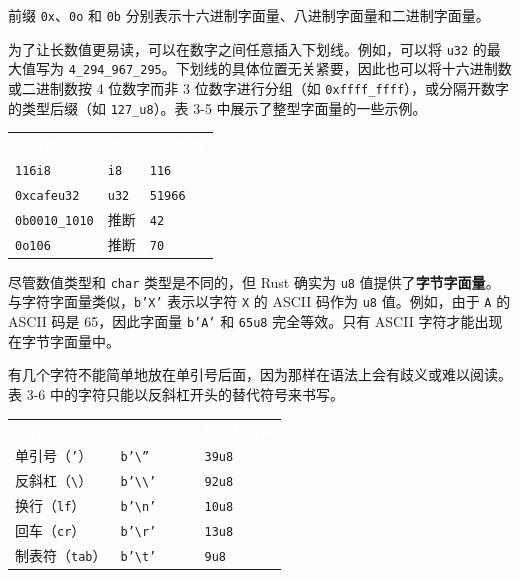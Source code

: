 前缀 \texttt{0x}、\texttt{0o} 和 \texttt{0b} 分别表示十六进制字面量、八进制字面量和二进制字面量。

为了让长数值更易读，可以在数字之间任意插入下划线。例如，可以将 \texttt{u32} 的最大值写为 \texttt{4\_294\_967\_295}。下划线的具体位置无关紧要，因此也可以将十六进制数或二进制数按 4 位数字而非 3 位数字进行分组（如 \texttt{0xffff\_ffff}），或分隔开数字的类型后缀（如 \texttt{127\_u8}）。表 3-5 中展示了整型字面量的一些示例。


\myTableBegin
\begin{tabularx}{\textwidth}{@{}>{\hsize=1.142\hsize\raggedright\arraybackslash}X>{\hsize=0.903\hsize\raggedright\arraybackslash}X>{\hsize=0.956\hsize\raggedright\arraybackslash}X@{}}
\rowcolor{tabhead}\textcolor{white}{字面量} & \textcolor{white}{类型} & \textcolor{white}{十进制值} \\
\texttt{116i8} & \texttt{i8} & \texttt{116} \\
\texttt{0xcafeu32} & \texttt{u32} & \texttt{51966} \\
\texttt{0b0010\_1010} & 推断 & \texttt{42} \\
\texttt{0o106} & 推断 & \texttt{70} \\
\end{tabularx}
\myTableEnd

尽管数值类型和 \texttt{char} 类型是不同的，但 Rust 确实为 \texttt{u8} 值提供了\textbf{字节字面量}。与字符字面量类似，\texttt{b'X'} 表示以字符 \texttt{X} 的 ASCII 码作为 \texttt{u8} 值。例如，由于 \texttt{A} 的 ASCII 码是 65，因此字面量 \texttt{b'A'} 和 \texttt{65u8} 完全等效。只有 ASCII 字符才能出现在字节字面量中。

有几个字符不能简单地放在单引号后面，因为那样在语法上会有歧义或难以阅读。表 3-6 中的字符只能以反斜杠开头的替代符号来书写。


\myTableBegin
\begin{tabularx}{\textwidth}{@{}>{\hsize=1.020\hsize\raggedright\arraybackslash}X>{\hsize=1.294\hsize\raggedright\arraybackslash}X>{\hsize=0.686\hsize\raggedright\arraybackslash}X@{}}
\rowcolor{tabhead}\textcolor{white}{字符} & \textcolor{white}{字节字面量} & \textcolor{white}{等效的数值} \\
单引号（\texttt{'}） & \texttt{b'\textbackslash{}''} & \texttt{39u8} \\
反斜杠（\texttt{\textbackslash{}}） & \texttt{b'\textbackslash{}\textbackslash{}'} & \texttt{92u8} \\
换行（\texttt{lf}） & \texttt{b'\textbackslash{}n'} & \texttt{10u8} \\
回车（\texttt{cr}） & \texttt{b'\textbackslash{}r'} & \texttt{13u8} \\
制表符（\texttt{tab}） & \texttt{b'\textbackslash{}t'} & \texttt{9u8} \\
\end{tabularx}
\myTableEnd

